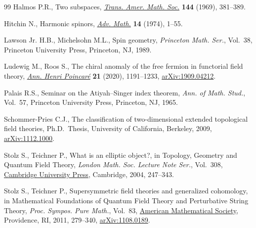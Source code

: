 \documentclass[pdftex]{sigma}
\numberwithin{equation}{section}
\begin{document}
\begin{thebibliography}{99}
Halmos P.R., Two subspaces, \href{https://doi.org/10.2307/1995288}{\textit{Trans. Amer. Math. Soc.}} \textbf{144}
 (1969), 381--389.

Hitchin N., Harmonic spinors, \href{https://doi.org/10.1016/0001-8708(74)90021-8}{\textit{Adv. Math.}} \textbf{14} (1974), 1--55.

Lawson Jr. H.B., Michelsohn M.L., Spin geometry, \textit{Princeton Math. Ser.},
 Vol.~38, Princeton University Press, Princeton, NJ, 1989.

Ludewig M., Roos S., The chiral anomaly of the free fermion in functorial field
 theory, \href{https://doi.org/10.1007/s00023-020-00893-6}{\textit{Ann. Henri Poincar\'e}} \textbf{21} (2020), 1191--1233,
 \href{https://arxiv.org/abs/1909.04212}{arXiv:1909.04212}.

Palais R.S., Seminar on the {A}tiyah--{S}inger index theorem, \textit{Ann. of
 Math. Stud.}, Vol.~57, Princeton University Press, Princeton, NJ, 1965.

Schommer-Pries C.J., The classification of two-dimensional extended topological
 field theories, Ph.D.~Thesis, {U}niversity of {C}alifornia, Berkeley, 2009,
 \href{https://arxiv.org/abs/1112.1000}{arXiv:1112.1000}.

Stolz S., Teichner P., What is an elliptic object?, in Topology, {G}eometry and
 {Q}uantum {F}ield {T}heory, \textit{London Math. Soc. Lecture Note Ser.},
 Vol.~308, \href{https://doi.org/10.1017/CBO9780511526398.013}{Cambridge University Press}, Cambridge, 2004, 247--343.

Stolz S., Teichner P., Supersymmetric field theories and generalized
 cohomology, in Mathematical {F}oundations of {Q}uantum {F}ield {T}heory and
 {P}erturbative {S}tring {T}heory, \textit{Proc. Sympos. Pure Math.}, Vol.~83,
 \href{https://doi.org/10.1090/pspum/083/2742432}{American Mathematical Society}, Providence, RI, 2011, 279--340,
 \href{https://arxiv.org/abs/1108.0189}{arXiv:1108.0189}.

\end{thebibliography}\LastPageEnding
\end{document}
